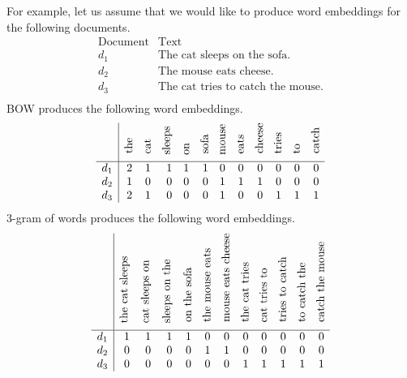 For example, let us assume that we would like to produce word embeddings for the following documents.
\begin{displaymath}
\begin{array}{l|l}
\text{Document} & \text{Text} \\ 
\hline
d_1 & \text{The cat sleeps on the sofa.} \\
d_2 & \text{The mouse eats cheese.} \\
d_3 & \text{The cat tries to catch the mouse.} \\
\end{array}
\end{displaymath}
BOW produces the following word embeddings.
\begin{displaymath}
\begin{array}{l|rrrrrrrrrrr}
& \rotatebox[origin=l]{90}{the} &  \rotatebox[origin=l]{90}{cat} &  \rotatebox[origin=l]{90}{sleeps}  & \rotatebox[origin=l]{90}{on} &  \rotatebox[origin=l]{90}{sofa} & \rotatebox[origin=l]{90}{mouse} & \rotatebox[origin=l]{90}{eats} & \rotatebox[origin=l]{90}{cheese} & \rotatebox[origin=l]{90}{tries} & \rotatebox[origin=l]{90}{to} & \rotatebox[origin=l]{90}{catch} \\ 
\hline
d_1 & 2 & 1 & 1 & 1 & 1 & 0 & 0 & 0 & 0 & 0 & 0\\
d_2 & 1 & 0 & 0 & 0 & 0 & 1 & 1 & 1 & 0 & 0 & 0\\
d_3 & 2 & 1 & 0 & 0 & 0 & 1 & 0 & 0 & 1 & 1 & 1\\
\end{array}
\end{displaymath}
3-gram of words produces the following word embeddings.
\begin{displaymath}
\begin{array}{l|rrrrrrrrrrr}
& \rotatebox[origin=l]{90}{the cat sleeps} &  \rotatebox[origin=l]{90}{cat sleeps on} &  \rotatebox[origin=l]{90}{sleeps on the}  & \rotatebox[origin=l]{90}{on the sofa} &  \rotatebox[origin=l]{90}{the mouse eats} & \rotatebox[origin=l]{90}{mouse eats cheese} & \rotatebox[origin=l]{90}{the cat tries} & \rotatebox[origin=l]{90}{cat tries to} & \rotatebox[origin=l]{90}{tries to catch} & \rotatebox[origin=l]{90}{to catch the} & \rotatebox[origin=l]{90}{catch the mouse} \\ 
\hline
d_1 & 1 & 1 & 1 & 1 & 0 & 0 & 0 & 0 & 0 & 0 & 0\\
d_2 & 0 & 0 & 0 & 0 & 1 & 1 & 0 & 0 & 0 & 0 & 0\\
d_3 & 0 & 0 & 0 & 0 & 0 & 0 & 1 & 1 & 1 & 1 & 1\\
\end{array}
\end{displaymath}
